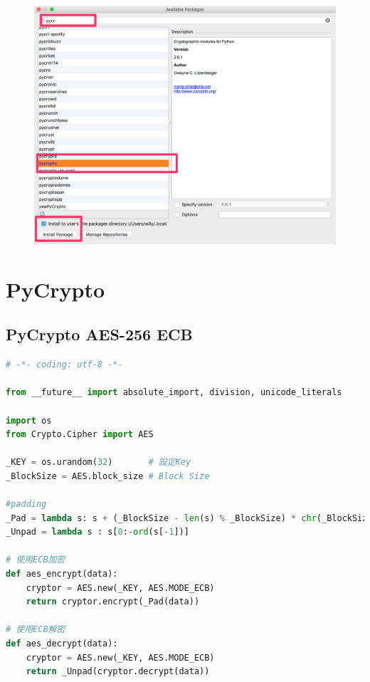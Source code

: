 \documentclass[12pt,a4paper]{article}
\begin{document}
{\begin{figure}[ht]
	\begin{center}
		\includegraphics[scale=0.2]{image/PyCharm3.png}
	\end{center}
\end{figure}

}

\newpage %
\section{PyCrypto}

\subsection{PyCrypto AES-256 ECB}
{

\begin{lstlisting}[language=Python]
# -*- coding: utf-8 -*-

from __future__ import absolute_import, division, unicode_literals

import os
from Crypto.Cipher import AES

_KEY = os.urandom(32)		# 設定Key
_BlockSize = AES.block_size	# Block Size

#padding
_Pad = lambda s: s + (_BlockSize - len(s) % _BlockSize) * chr(_BlockSize - len(s) % _BlockSize)
_Unpad = lambda s : s[0:-ord(s[-1])]

# 使用ECB加密
def aes_encrypt(data):
    cryptor = AES.new(_KEY, AES.MODE_ECB)
    return cryptor.encrypt(_Pad(data))

# 使用ECB解密
def aes_decrypt(data):
    cryptor = AES.new(_KEY, AES.MODE_ECB)
    return _Unpad(cryptor.decrypt(data))
\end{lstlisting}
}
\end{document}
